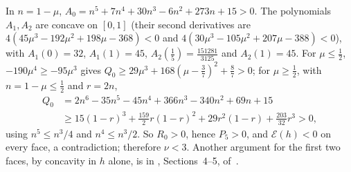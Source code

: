 In $n=1-\mu$, $A_0=n^5+7n^4+30n^3-6n^2+273n+15>0$. The polynomials $A_1,A_2$ are concave on
$[0,1]$ (their second derivatives are $4(45\mu^3-192\mu^2+198\mu-368)<0$ and
$4(30\mu^3-105\mu^2+207\mu-388)<0$), with $A_1(0)=32$, $A_1(1)=45$,
$A_2(\frac15)=\frac{151281}{3125}$ and $A_2(1)=45$. For $\mu\le\frac12$, $-190\mu^4\ge-95\mu^3$ gives
$Q_0\ge29\mu^3+168(\mu-\frac37)^2+\frac87>0$; for $\mu\ge\frac12$, with $n=1-\mu\le\frac12$ and
$r=2n$,
\begin{align*}
Q_0&=2n^6-35n^5-45n^4+366n^3-340n^2+69n+15\\
&\ge15(1-r)^3+\tfrac{159}2r(1-r)^2+29r^2(1-r)+\tfrac{203}{32}r^3>0,
\end{align*}
using $n^5\le n^3/4$ and $n^4\le n^3/2$. So $R_0>0$, hence $P_5>0$, and $\mathcal E(h)<0$ on every
face, a contradiction; therefore $\nu<3$. Another argument for the first two faces, by concavity
in $h$ alone, is in , Sections~4--5, of~\cite{Notes}.
